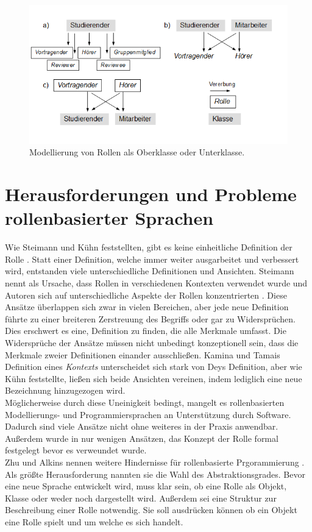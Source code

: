 \documentclass[conference]{IEEEtran}
\begin{document}
\begin{figure}
\includegraphics[scale=0.6]{Images/OomRoleProblems.PNG}
\caption{Modellierung von Rollen als Oberklasse oder Unterklasse.}
\end{figure}
\section{Herausforderungen und Probleme rollenbasierter Sprachen} Wie Steimann und Kühn feststellten, gibt es keine einheitliche Definition der Rolle \cite{family}\cite{steimann2000representation}. Statt einer Definition, welche immer weiter ausgarbeitet und verbessert wird, entstanden viele unterschiedliche Definitionen und Ansichten. Steimann nennt als Ursache, dass Rollen in verschiedenen Kontexten verwendet wurde und Autoren sich auf unterschiedliche Aspekte der Rollen konzentrierten \cite{steimann2000representation}. Diese Ansätze überlappen sich zwar in vielen Bereichen, aber jede neue Definition führte zu einer breiteren Zerstreuung des Begriffs oder gar zu Widersprüchen. Dies erschwert es eine, Definition zu finden, die alle Merkmale umfasst. Die Widersprüche der Ansätze müssen nicht unbedingt konzeptionell sein, dass die Merkmale zweier Definitionen einander ausschließen. Kamina und Tamais Definition\cite{kamina2005selective} eines \textit{Kontexts} unterscheidet sich stark von Deys Definition\cite{dey2001understanding}, aber wie Kühn feststellte, ließen sich beide Ansichten vereinen, indem lediglich eine neue Bezeichnung hinzugezogen wird.  \\ Möglicherweise durch diese Uneinigkeit bedingt, mangelt es rollenbasierten Modellierungs- und Programmiersprachen an Unterstützung durch Software. Dadurch sind viele Ansätze nicht ohne weiteres in der Praxis anwendbar. Außerdem wurde in nur wenigen Ansätzen, das Konzept der Rolle formal festgelegt bevor es verweundet wurde.\\ Zhu und Alkins nennen weitere Hindernisse für rollenbasierte Prgorammierung \cite{zhu2006towards}. Als größte Herausforderung nannten sie die Wahl des Abstraktionsgrades. Bevor eine neue Sprache entwickelt wird, muss klar sein, ob eine Rolle als Objekt, Klasse oder weder noch dargestellt wird. Außerdem sei eine Struktur zur Beschreibung einer Rolle notwendig. Sie soll ausdrücken können ob ein Objekt eine Rolle spielt und um welche es sich handelt. \\
\end{document}
